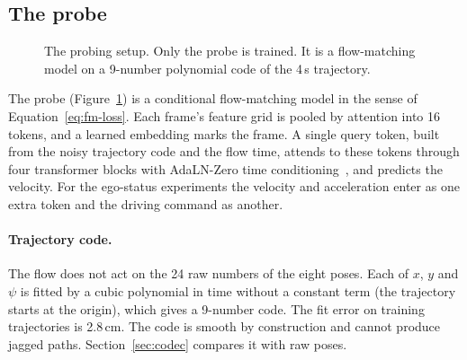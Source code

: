 \subsection{The probe}
\label{sec:probe}

\begin{figure}[htbp]
\centering
{}
\caption{The probing setup. Only the probe is trained. It is a flow-matching
model on a 9-number polynomial code of the 4\,s trajectory.}
\label{fig:probe}
\end{figure}

The probe (Figure~\ref{fig:probe}) is a conditional flow-matching model in the
sense of Equation~\eqref{eq:fm-loss}. Each frame's feature grid is pooled by
attention into 16 tokens, and a learned embedding marks the frame. A single query
token, built from the noisy trajectory code and the flow time, attends to these
tokens through four transformer blocks with AdaLN-Zero time
conditioning~\cite{dit}, and predicts the velocity. For the ego-status
experiments the velocity and acceleration enter as one extra token and the
driving command as another.

\paragraph{Trajectory code.}
The flow does not act on the 24 raw numbers of the eight poses. Each of $x$, $y$
and $\psi$ is fitted by a cubic polynomial in time without a constant term (the
trajectory starts at the origin), which gives a 9-number code. The fit error on
training trajectories is 2.8\,cm. The code is smooth by construction and cannot
produce jagged paths. Section~\ref{sec:codec} compares it with raw poses.

